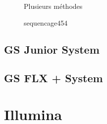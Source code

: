 \documentclass[a4paper]{article}
\begin{document}
\begin{figure}[!h]
\caption{Plusieurs méthodes}
\end{figure}


\begin{figure}[!h]
\caption{sequencage454}
\end{figure}

\subsection{GS Junior System}

\subsection{GS FLX + System}

\section{Illumina}
\end{document}
